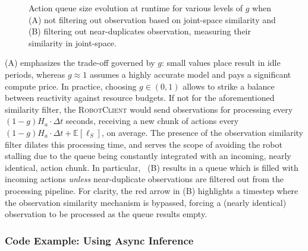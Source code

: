 \begin{figure}
    \centering
    \begin{minipage}[t]{0.99\textwidth}
        \centering
        \caption{Action queue size evolution at runtime for various levels of \( g\) when (A) not filtering out observation based on joint-space similarity and (B) filtering out near-duplicates observation, measuring their similarity in joint-space.}
        \label{fig:queues}
    \end{minipage}
\end{figure}

(A) emphasizes the trade-off governed by \(g\): small values place result in idle periods, whereas \(g\approx 1\) assumes a highly accurate model and pays a significant compute price. In practice, choosing \(g\in(0,1)\) allows to strike a balance between reactivity against resource budgets. 
If not for the aforementioned similarity filter, the \textsc{RobotClient} would send observations for processing every \( (1 - g) H_a \cdot \Delta t\) seconds, receiving a new chunk of actions every \( (1 - g) H_a \cdot \Delta t + \mathbb E[\ell_S] \), on average. 
The presence of the observation similarity filter dilates this processing time, and serves the scope of avoiding the robot stalling due to the queue being constantly integrated with an incoming, nearly identical, action chunk. 
In particular, ~(B) results in a queue which is filled with incoming actions \emph{unless} near-duplicate observations are filtered out from the processing pipeline. For clarity, the red arrow in (B) highlights a timestep where the observation similarity mechanism is bypassed, forcing a (nearly identical) observation to be processed as the queue results empty.

\subsubsection{Code Example: Using Async Inference}
